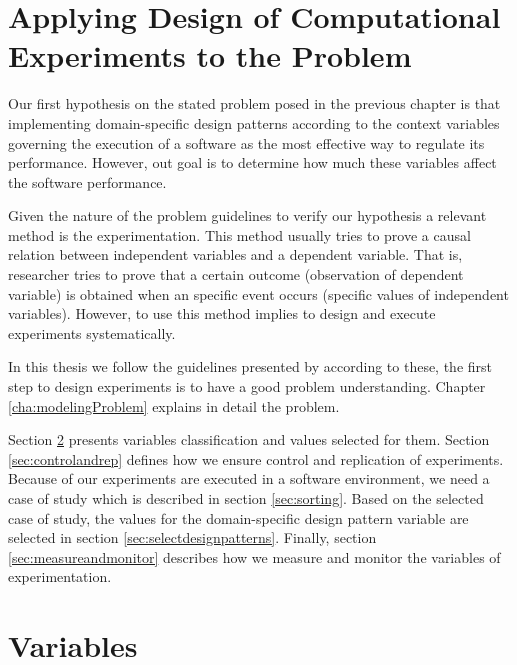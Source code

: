 \section{Applying Design of Computational Experiments to the Problem}
Our first hypothesis on the stated problem posed in the previous chapter is that implementing domain-specific design patterns according to the context variables governing the execution of a software as the most effective way to regulate its performance. However, out goal is to determine how much these variables affect the software performance. 

Given  the nature of the problem guidelines to verify our hypothesis a relevant method is the experimentation. This method usually tries to prove a causal relation between independent variables and a dependent variable. That is, researcher tries to prove that a certain outcome (observation of dependent variable) is obtained when an specific event occurs (specific values of independent variables). However, to use this method implies to design and execute experiments systematically.

In this thesis we follow the guidelines presented by \cite{} according to these, the first step to design experiments is to have a good problem understanding. Chapter \ref{cha:modelingProblem} explains in detail the problem. 

Section \ref{sec:variables} presents variables classification and values selected for them. Section \ref{sec:controlandrep} defines how we ensure control and replication of experiments. Because of our experiments are executed in a software environment, we need a case of study which is described in section \ref{sec:sorting}. Based on the selected case of study, the values for the domain-specific design pattern variable are selected in section \ref{sec:selectdesignpatterns}. Finally, section \ref{sec:measureandmonitor} describes how we measure and monitor the variables of experimentation.

\section{Variables}
\label{sec:variables}

